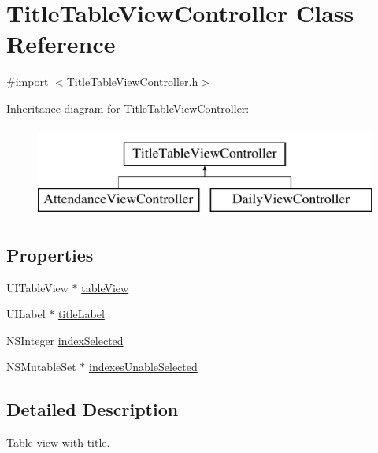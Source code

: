 \hypertarget{interface_title_table_view_controller}{\section{Title\+Table\+View\+Controller Class Reference}
\label{interface_title_table_view_controller}
}


{\ttfamily \#import $<$Title\+Table\+View\+Controller.\+h$>$}

Inheritance diagram for Title\+Table\+View\+Controller\+:\begin{figure}[H]
\begin{center}
\leavevmode
\includegraphics[height=3.000000cm]{interface_title_table_view_controller}
\end{center}
\end{figure}
\subsection*{Properties}
\begin{DoxyCompactItemize}
\item 
U\+I\+Table\+View $\ast$ \hyperlink{interface_title_table_view_controller_a28fd55d5b91428c42c821986765afc79}{table\+View}
\item 
U\+I\+Label $\ast$ \hyperlink{interface_title_table_view_controller_ac0cf26350746393ad93fae7c1dc0f071}{title\+Label}
\item 
N\+S\+Integer \hyperlink{interface_title_table_view_controller_a836ce3317d51d9812f9407611df8327e}{index\+Selected}
\item 
N\+S\+Mutable\+Set $\ast$ \hyperlink{interface_title_table_view_controller_a97663dd3b86d043d6371a80216ecaf1d}{indexes\+Unable\+Selected}
\end{DoxyCompactItemize}


\subsection{Detailed Description}
Table view with title. 


